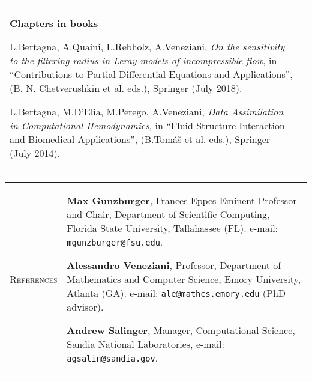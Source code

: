 \documentclass[10pt]{article}
\begin{document}
\begin{tabular}{p{2.5cm}|p{15.5cm}}
\vspace*{0.2cm}
\textbf{Chapters in books}

\vspace*{0.2cm}
L.Bertagna, A.Quaini, L.Rebholz, A.Veneziani, \textit{On the sensitivity to the filtering radius in Leray models of incompressible flow}, in ``Contributions to Partial Differential Equations and Applications'', (B. N. Chetverushkin et al. eds.), Springer (July 2018).

\vspace*{0.2cm}
L.Bertagna, M.D'Elia, M.Perego, A.Veneziani, \textit{Data Assimilation in Computational Hemodynamics}, in ``Fluid-Structure Interaction and Biomedical Applications'', (B.Tomáš et al. eds.), Springer (July 2014).
\vspace{0.2cm}
\\
\end{tabular}

\begin{tabular}{p{2.5cm}|p{15.5cm}}
\\
\textsc{References} & \textbf{Max Gunzburger}, Frances Eppes Eminent Professor and Chair, Department of Scientific Computing, Florida State University, Tallahassee (FL). e-mail: \verb|mgunzburger@fsu.edu|.

\vspace*{0.1cm}
\textbf{Alessandro Veneziani}, Professor, Department of Mathematics and Computer Science, Emory University, Atlanta (GA). e-mail: \verb|ale@mathcs.emory.edu| (PhD advisor).

\vspace*{0.1cm}
\textbf{Andrew Salinger}, Manager, Computational Science, Sandia National Laboratories, e-mail: \verb|agsalin@sandia.gov|.
\end{tabular}
\end{document}
